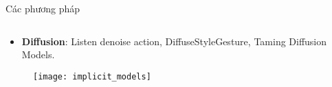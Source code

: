 \begin{frame}{Các phương pháp}
\begin{columns}
\begin{column}{0.5\textwidth}
{\begin{itemize}
			\item \textbf{Diffusion}: Listen denoise action, DiffuseStyleGesture, Taming Diffusion Models.
 \end{itemize}
 
 \begin{figure}
 	\texttt{[image: implicit\_models]}
 \end{figure}
 
		}
	\end{column}
\end{columns}

%	

	


	

\end{frame}
